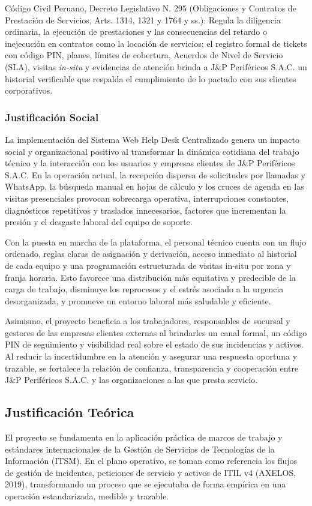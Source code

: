 Código Civil Peruano, Decreto Legislativo N.\textdegree{} 295 (Obligaciones y Contratos de Prestación de Servicios, Arts. 1314, 1321 y 1764 y ss.): Regula la diligencia ordinaria, la ejecución de prestaciones y las consecuencias del retardo o inejecución en contratos como la locación de servicios; el registro formal de tickets con código PIN, planes, límites de cobertura, Acuerdos de Nivel de Servicio (SLA), visitas \textit{in-situ} y evidencias de atención brinda a J\&P Periféricos S.A.C. un historial verificable que respalda el cumplimiento de lo pactado con sus clientes corporativos.

\subsubsection{Justificación Social}
La implementación del Sistema Web Help Desk Centralizado genera un impacto social y organizacional positivo al transformar la dinámica cotidiana del trabajo técnico y la interacción con los usuarios y empresas clientes de J\&P Periféricos S.A.C. En la operación actual, la recepción dispersa de solicitudes por llamadas y WhatsApp, la búsqueda manual en hojas de cálculo y los cruces de agenda en las visitas presenciales provocan sobrecarga operativa, interrupciones constantes, diagnósticos repetitivos y traslados innecesarios, factores que incrementan la presión y el desgaste laboral del equipo de soporte.

Con la puesta en marcha de la plataforma, el personal técnico cuenta con un flujo ordenado, reglas claras de asignación y derivación, acceso inmediato al historial de cada equipo y una programación estructurada de visitas in-situ por zona y franja horaria. Esto favorece una distribución más equitativa y predecible de la carga de trabajo, disminuye los reprocesos y el estrés asociado a la urgencia desorganizada, y promueve un entorno laboral más saludable y eficiente.

Asimismo, el proyecto beneficia a los trabajadores, responsables de sucursal y gestores de las empresas clientes externas al brindarles un canal formal, un código PIN de seguimiento y visibilidad real sobre el estado de sus incidencias y activos. Al reducir la incertidumbre en la atención y asegurar una respuesta oportuna y trazable, se fortalece la relación de confianza, transparencia y cooperación entre J\&P Periféricos S.A.C. y las organizaciones a las que presta servicio.

\subsection{Justificación Teórica}
El proyecto se fundamenta en la aplicación práctica de marcos de trabajo y estándares internacionales de la Gestión de Servicios de Tecnologías de la Información (ITSM). En el plano operativo, se toman como referencia los flujos de gestión de incidentes, peticiones de servicio y activos de ITIL v4 (AXELOS, 2019), transformando un proceso que se ejecutaba de forma empírica en una operación estandarizada, medible y trazable.

